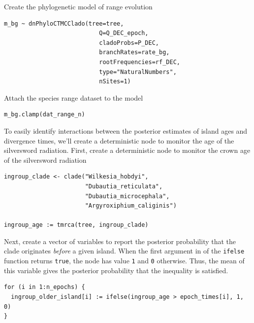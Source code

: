 Create the phylogenetic model of range evolution

\begin{snugshade}
\begin{lstlisting}
m_bg ~ dnPhyloCTMCClado(tree=tree,
                           Q=Q_DEC_epoch,
                           cladoProbs=P_DEC,
                           branchRates=rate_bg,
                           rootFrequencies=rf_DEC,
                           type="NaturalNumbers",
                           nSites=1)        
\end{lstlisting}
\end{snugshade}


Attach the species range dataset to the model

\begin{snugshade}
\begin{lstlisting}
m_bg.clamp(dat_range_n)
\end{lstlisting}
\end{snugshade}


To easily identify interactions between the posterior estimates of island ages and divergence times, we'll create a deterministic node to monitor the age of the silversword radiation.
First, create a deterministic node to monitor the crown age of the silversword radiation

\begin{snugshade}
\begin{lstlisting}
ingroup_clade <- clade("Wilkesia_hobdyi",
                       "Dubautia_reticulata",
                       "Dubautia_microcephala",
                       "Argyroxiphium_caliginis")

ingroup_age := tmrca(tree, ingroup_clade)
\end{lstlisting}
\end{snugshade}

Next, create a vector of variables to report the posterior probability that the clade originates {\it before} a given island.
When the first argument in of the {\tt ifelse} function returns {\tt true}, the node has value {\tt 1} and {\tt 0} otherwise.
Thus, the mean of this variable gives the posterior probability that the inequality is satisfied.

\begin{snugshade}
\begin{lstlisting}
for (i in 1:n_epochs) {
  ingroup_older_island[i] := ifelse(ingroup_age > epoch_times[i], 1, 0)
}
\end{lstlisting}
\end{snugshade}

